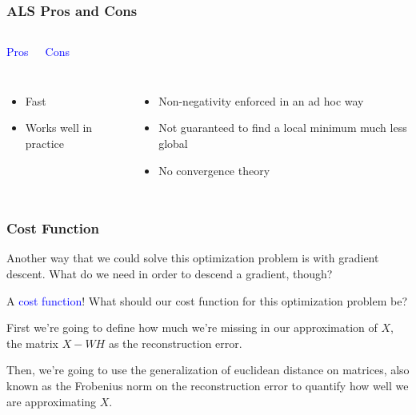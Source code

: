 \documentclass{beamer}
\begin{document}
\begin{frame}
  \frametitle{ALS Pros and Cons}
  \begin{columns}
    \begin{center} {\LARGE \textcolor{blue}{Pros}} \end{center}
    \begin{center} {\LARGE \textcolor{blue}{Cons}} \end{center}
  \end{columns} \vspace{4mm}
  \begin{columns}
    \begin{itemize}
      \item Fast
      \item Works well in practice
    \end{itemize}
    \begin{itemize}
      \item Non-negativity enforced in an ad hoc way
      \item Not guaranteed to find a local minimum much less global
      \item No convergence theory
    \end{itemize}
  \end{columns}
\end{frame}

\begin{frame}
  \frametitle{Cost Function}
  Another way that we could solve this optimization problem is with gradient descent. What do we need in order to descend a gradient, though? \vspace{4mm} \pause

  A \textcolor{blue}{cost function}! What should our cost function for this optimization problem be? \vspace{4mm} \pause

  First we're going to define how much we're missing in our approximation of $X$, the matrix $X - WH$ as the reconstruction error. \vspace{4mm} \pause

  Then, we're going to use the generalization of euclidean distance on matrices, also known as the Frobenius norm on the reconstruction error to quantify how well we are approximating $X$.
\end{frame}
\end{document}
